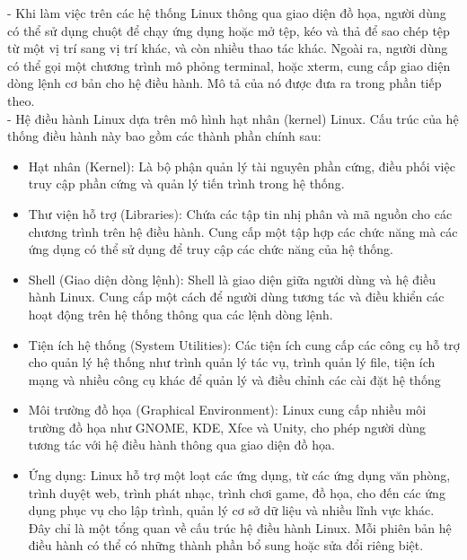 \documentclass[12pt,a4paper]{article}
\begin{document}
- Khi làm việc trên các hệ thống Linux thông qua giao diện đồ họa, người dùng có thể sử dụng chuột để chạy ứng dụng hoặc mở tệp, kéo và thả để sao chép tệp từ một vị trí sang vị trí khác, và còn nhiều thao tác khác. Ngoài ra, người dùng có thể gọi một chương trình mô phỏng terminal, hoặc xterm, cung cấp giao diện dòng lệnh cơ bản cho hệ điều hành. Mô tả của nó được đưa ra trong phần tiếp theo.\\

- Hệ điều hành Linux dựa trên mô hình hạt nhân (kernel) Linux. Cấu trúc của hệ thống điều hành này bao gồm các thành phần chính sau: 
\begin{itemize}
	\item Hạt nhân (Kernel): Là bộ phận quản lý tài nguyên phần cứng, điều phối việc truy cập phần cứng và quản lý tiến trình trong hệ thống.
	\item Thư viện hỗ trợ (Libraries): Chứa các tập tin nhị phân và mã nguồn cho các chương trình trên hệ điều hành. Cung cấp một tập hợp các chức năng mà các ứng dụng có thể sử dụng để truy cập các chức năng của hệ thống.
	\item Shell (Giao diện dòng lệnh): Shell là giao diện giữa người dùng và hệ điều hành Linux. Cung cấp một cách để người dùng tương tác và điều khiển các hoạt động trên hệ thống thông qua các lệnh dòng lệnh.
	\item Tiện ích hệ thống (System Utilities): Các tiện ích cung cấp các công cụ hỗ trợ cho quản lý hệ thống như trình quản lý tác vụ, trình quản lý file, tiện ích mạng và nhiều công cụ khác để quản lý và điều chỉnh các cài đặt hệ thống
	\item Môi trường đồ họa (Graphical Environment): Linux cung cấp nhiều môi trường đồ họa như GNOME, KDE, Xfce và Unity, cho phép người dùng tương tác với hệ điều hành thông qua giao diện đồ họa.
	\item Ứng dụng: Linux hỗ trợ một loạt các ứng dụng, từ các ứng dụng văn phòng, trình duyệt web, trình phát nhạc, trình chơi game, đồ họa, cho đến các ứng dụng phục vụ cho lập trình, quản lý cơ sở dữ liệu và nhiều lĩnh vực khác. Đây chỉ là một tổng quan về cấu trúc hệ điều hành Linux. Mỗi phiên bản hệ điều hành có thể có những thành phần bổ sung hoặc sửa đổi riêng biệt.
\end{itemize}
\end{document}
